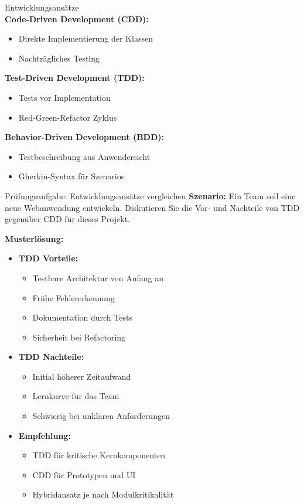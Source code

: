 \begin{definition}{Entwicklungsansätze}\\
\textbf{Code-Driven Development (CDD):}
\begin{itemize}
    \item Direkte Implementierung der Klassen
    \item Nachträgliches Testing
\end{itemize}

\textbf{Test-Driven Development (TDD):}
\begin{itemize}
    \item Tests vor Implementation
    \item Red-Green-Refactor Zyklus
\end{itemize}

\textbf{Behavior-Driven Development (BDD):}
\begin{itemize}
    \item Testbeschreibung aus Anwendersicht
    \item Gherkin-Syntax für Szenarios
\end{itemize}
\end{definition}

\begin{example2}{Prüfungsaufgabe: Entwicklungsansätze vergleichen}
\textbf{Szenario:}
Ein Team soll eine neue Webanwendung entwickeln. Diskutieren Sie die Vor- und Nachteile 
von TDD gegenüber CDD für dieses Projekt.

\textbf{Musterlösung:}
\begin{itemize}
    \item \textbf{TDD Vorteile:}
    \begin{itemize}
        \item Testbare Architektur von Anfang an
        \item Frühe Fehlererkennung
        \item Dokumentation durch Tests
        \item Sicherheit bei Refactoring
    \end{itemize}
    
    \item \textbf{TDD Nachteile:}
    \begin{itemize}
        \item Initial höherer Zeitaufwand
        \item Lernkurve für das Team
        \item Schwierig bei unklaren Anforderungen
    \end{itemize}
    
    \item \textbf{Empfehlung:}
    \begin{itemize}
        \item TDD für kritische Kernkomponenten
        \item CDD für Prototypen und UI
        \item Hybridansatz je nach Modulkritikalität
    \end{itemize}
\end{itemize}
\end{example2}

